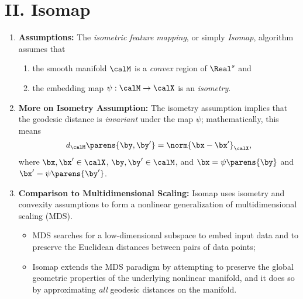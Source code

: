 \documentclass[12pt]{article}
\begin{document}
\section*{II. Isomap}

\begin{enumerate}[label=\textbf{\arabic*.}]

	\item \textbf{Assumptions:} The \emph{isometric feature mapping}, or simply \emph{Isomap}, algorithm assumes that 
	\begin{enumerate}
		\item the smooth manifold $\calM$ is a \emph{convex} region of $\Real^s$ and 
		\item the embedding map $\psi: \calM \to \calX$ is an \emph{isometry}. 
	\end{enumerate}
	
	\item \textbf{More on Isometry Assumption:} The isometry assumption implies that the geodesic distance is \emph{invariant} under the map $\psi$; mathematically, this means 
	\begin{align}
		d_{\calM} \parens{\by, \by'} = \norm{\bx - \bx'}_{\calX}, 
	\end{align}
	where $\bx, \bx' \in \calX$, $\by, \by' \in \calM$, and $\bx = \psi \parens{\by}$ and $\bx' = \psi \parens{\by'}$. 
	
	\item \textbf{Comparison to Multidimensional Scaling:} Isomap uses isometry and convexity assumptions to form a nonlinear generalization of multidimensional scaling (MDS). 
	\begin{itemize}
		\item MDS searches for a low-dimensional subspace to embed input data and to preserve the Euclidean distances between pairs of data points; 
		\item Isomap extends the MDS paradigm by attempting to preserve the global geometric properties of the underlying nonlinear manifold, and it does so by approximating \emph{all} geodesic distances on the manifold. 
	\end{itemize}
	

\end{enumerate}
\end{document}
